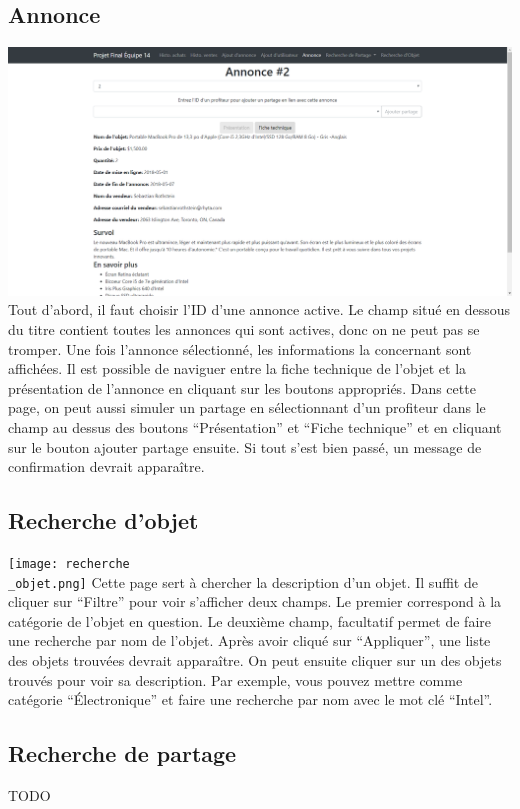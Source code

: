 \documentclass[a4paper,12pt]{article}
\begin{document}
\begin{spacing}{1}
    \subsection*{Annonce}
    \includegraphics[scale=0.6]{annonce.png}
Tout d'abord, il faut choisir l'ID d'une annonce active. Le champ situé en dessous du titre contient toutes les annonces qui sont actives, donc on ne peut pas se tromper. Une fois l'annonce sélectionné, les informations la concernant sont affichées. Il est possible de naviguer entre la fiche technique de l'objet et la présentation de l'annonce en cliquant sur les boutons appropriés.	
Dans cette page, on peut aussi simuler un partage en sélectionnant d'un profiteur dans le champ au dessus des boutons ``Présentation'' et ``Fiche technique'' et en cliquant sur le bouton ajouter partage ensuite. Si tout s'est bien passé, un message de confirmation devrait apparaître.

    \subsection*{Recherche d'objet}
    \texttt{[image: recherche\\\_objet.png]}
Cette page sert à chercher la description d'un objet. Il suffit de cliquer sur ``Filtre'' pour voir s'afficher deux champs. Le premier correspond à la catégorie de l'objet en question. Le deuxième champ, facultatif permet de faire une recherche par nom de l'objet. Après avoir cliqué sur ``Appliquer'', une liste des objets trouvées devrait apparaître. On peut ensuite cliquer sur un des objets trouvés pour voir sa description. 
Par exemple, vous pouvez mettre comme catégorie ``Électronique'' et faire une recherche par nom avec le mot clé ``Intel''.

    \subsection*{Recherche de partage}
    TODO


	\end{spacing}                                                 
\end{document}
